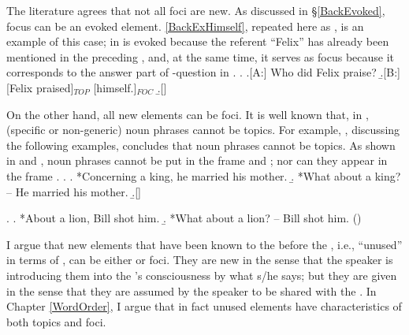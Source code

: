 The literature agrees that
not all foci are new.
As discussed in \S \ref{BackEvoked},
focus can be an evoked element.
\ref{BackExHimself}, repeated here as \Next,
is an example of this case;
 in \Next[B] is evoked because the referent ``Felix'' has already been mentioned in the preceding  \Next[A],
and, at the same time, it serves as focus because it corresponds to the answer part of -question in \Next[A].
%
\ex. \a.[A:] Who did Felix praise?
     \b.[B:] [Felix praised]$_{TOP}$ [himself.]$_{FOC}$
     \b.[] \hfill{\cite[72, style modified by NN]{reinhart81}}


On the other hand,
all new elements can be foci.
It is well known that, in , (specific or non-generic)  noun phrases cannot be topics.
For example, , discussing the following examples,
concludes that  noun phrases cannot be topics.
As shown in \Next[a] and \NNext[a],
 noun phrases cannot be put in the frame  and ;
nor can they appear in the frame .
%
\ex. 
  \a. *Concerning a  king, he married his mother.
  \b. *What about a  king? -- He married his mother.
  \b.[] \hfill{\cite[54]{gundel74}}

\ex.
  \a. *About a lion, Bill shot him.
  \b. *What about a lion? -- Bill shot him.
     \hfill{()}


I argue that new elements that have been known to the  before the , i.e., ``unused'' in terms of , can be either  or foci.
They are new in the sense that the speaker is introducing them into the 's consciousness by what s/he says;
but they are given in the sense that they are assumed by the speaker to be shared with the .
In Chapter \ref{WordOrder},
I argue that in fact unused elements have characteristics of both topics and foci.
%

